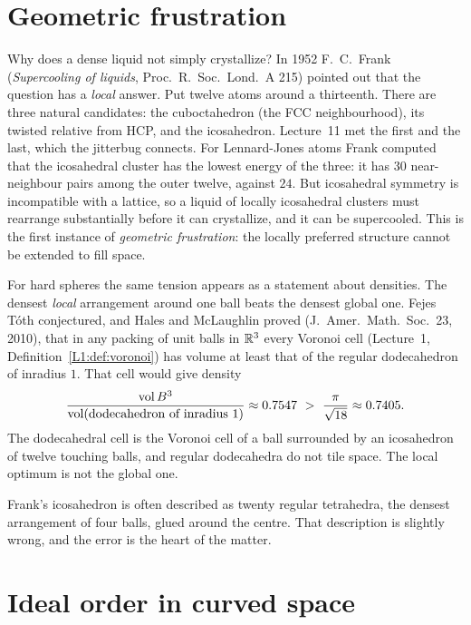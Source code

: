 \section{Geometric frustration}
\label{SM:sec:frustration}

Why does a dense liquid not simply crystallize? In 1952 F.~C.~Frank (\emph{Supercooling of liquids},
Proc.\ R.\ Soc.\ Lond.\ A 215) pointed out that the question has a \emph{local} answer. Put twelve atoms
around a thirteenth. There are three natural candidates: the cuboctahedron (the FCC neighbourhood), its
twisted relative from HCP, and the icosahedron. Lecture~11 met the first and the last, which the jitterbug
connects. For
Lennard-Jones atoms Frank computed that the icosahedral cluster has the lowest energy of the three: it
has $30$ near-neighbour pairs among the outer twelve, against $24$. But icosahedral symmetry is
incompatible with a lattice, so a liquid of locally icosahedral clusters must rearrange substantially
before it can crystallize, and it can be supercooled. This is the first instance of \emph{geometric
frustration}: the locally preferred structure cannot be extended to fill space.

For hard spheres the same tension appears as a statement about densities. The densest \emph{local}
arrangement around one ball beats the densest global one. Fejes T\'oth conjectured, and Hales and
McLaughlin proved (J.~Amer.\ Math.\ Soc.\ 23, 2010), that in any packing of unit balls in $\mathbb{R}^3$ every
Voronoi cell (Lecture~1, Definition~\ref{L1:def:voronoi}) has volume at least that of the regular
dodecahedron of inradius $1$. That cell would give density
\[
  \frac{\operatorname{vol}B^3}{\operatorname{vol}(\text{dodecahedron of inradius }1)}\approx0.7547\ >\ \frac{\pi}{\sqrt{18}}\approx0.7405 .
\]
The dodecahedral cell is the Voronoi cell of a ball surrounded by an icosahedron of twelve touching balls,
and regular dodecahedra do not tile space. The local optimum is not the global one.

Frank's icosahedron is often described as twenty regular tetrahedra, the densest arrangement of four
balls, glued around the centre. That description is slightly wrong, and the error is the heart of the
matter.



\section{Ideal order in curved space}
\label{SM:sec:curved}

